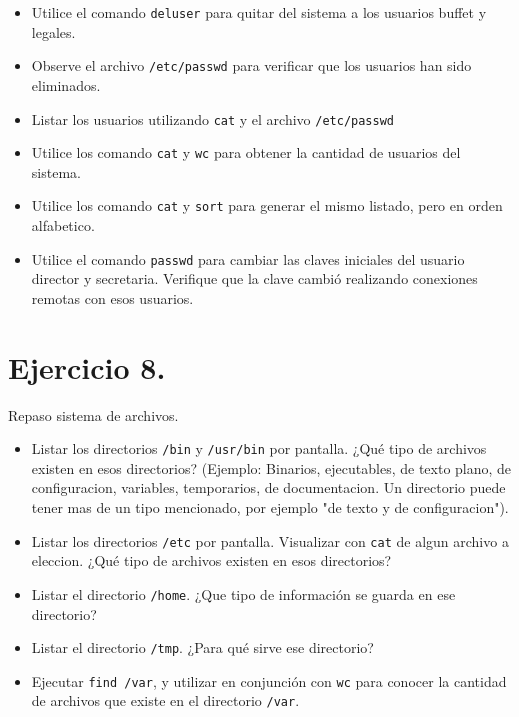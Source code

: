 \documentclass[12pt]{article}
\begin{document}
\begin{itemize}
\item Utilice el comando \texttt{deluser} para quitar del sistema a los usuarios buffet y legales.
\item Observe el archivo \texttt{/etc/passwd} para verificar que los usuarios han sido eliminados.
\item Listar los usuarios utilizando \texttt{cat} y el archivo \texttt{/etc/passwd}
\item Utilice los comando \texttt{cat} y \texttt{wc} para obtener la cantidad de usuarios del sistema.
\item Utilice los comando \texttt{cat} y \texttt{sort} para generar el mismo listado, pero en orden alfabetico.
\item Utilice el comando \texttt{passwd} para cambiar las claves iniciales del usuario director y secretaria. Verifique que la clave cambió realizando conexiones remotas con esos usuarios.
\end{itemize}

\section{Ejercicio 8.}
Repaso sistema de archivos.

\begin{itemize}
\item Listar los directorios \texttt{/bin} y \texttt{/usr/bin} por pantalla. ¿Qué tipo de archivos existen en esos directorios? (Ejemplo: Binarios, ejecutables, de texto plano, de configuracion, variables, temporarios, de documentacion. Un directorio puede tener mas de un tipo mencionado, por ejemplo "de texto y de configuracion").
\item Listar los directorios \texttt{/etc} por pantalla. Visualizar con \texttt{cat} de algun archivo a eleccion. ¿Qué tipo de archivos existen en esos directorios?
\item Listar el directorio \texttt{/home}. ¿Que tipo de información se guarda en ese directorio?
\item Listar el directorio \texttt{/tmp}. ¿Para qué sirve ese directorio?
\item Ejecutar \texttt{find /var}, y utilizar en conjunción con \texttt{wc} para conocer la cantidad de archivos que existe en el directorio \texttt{/var}.
\end{itemize}
\end{document}
